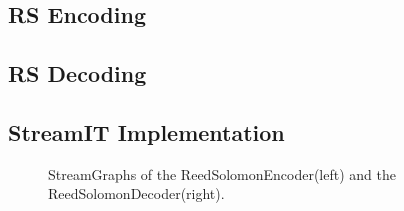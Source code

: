 \subsection{RS Encoding}

\subsection{RS Decoding}


\subsection{StreamIT Implementation}
\begin{figure}
\center
\epsfxsize=3.0in
\epsfxsize=3.0in
\caption{StreamGraphs of the ReedSolomonEncoder(left) and the ReedSolomonDecoder(right).}
\label{fig:sg-reed-solomon}
\end{figure}

